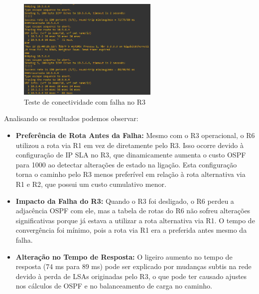 \documentclass[11pt,english, openright, oneside]{book}
\begin{document}
\begin{enumerate}
\begin{enumerate}
\begin{enumerate}
                \begin{figure}[H]
                  \centering
                  \includegraphics[width=0.6\textwidth]{imagens/Tarefa6/31.router_failure_6.png}
                  \caption{Teste de conectividade com falha no R3}
                \end{figure}

                Analisando os resultados podemos observar:
                \begin{itemize}
                  \item \textbf{Preferência de Rota Antes da Falha:} Mesmo com o R3 operacional, o R6 utilizou a rota via R1 em vez de diretamente pelo R3.
                  Isso ocorre devido à configuração de IP SLA no R3, que dinamicamente aumenta o custo OSPF para 1000 ao detectar alterações de estado na ligação. Esta configuração torna o caminho pelo R3 menos preferível em relação à rota alternativa via R1 e R2, que possui um custo cumulativo menor.
                  
                  \item \textbf{Impacto da Falha do R3:} Quando o R3 foi desligado, o R6 perdeu a adjacência OSPF com ele, mas a tabela de rotas do R6 não sofreu alterações significativas porque já estava a utilizar a rota alternativa via R1.
                  O tempo de convergência foi mínimo, pois a rota via R1 era a preferida antes mesmo da falha.

                  \item \textbf{Alteração no Tempo de Resposta:} O ligeiro aumento no tempo de resposta (74 ms para 89 ms) pode ser explicado por mudanças subtis na rede devido à perda de LSAs originadas pelo R3, o que pode ter causado ajustes nos cálculos de OSPF e no balanceamento de carga no caminho.
                \end{itemize}              
            \end{enumerate}

        \end{enumerate}
  

\end{enumerate}
\end{document}
